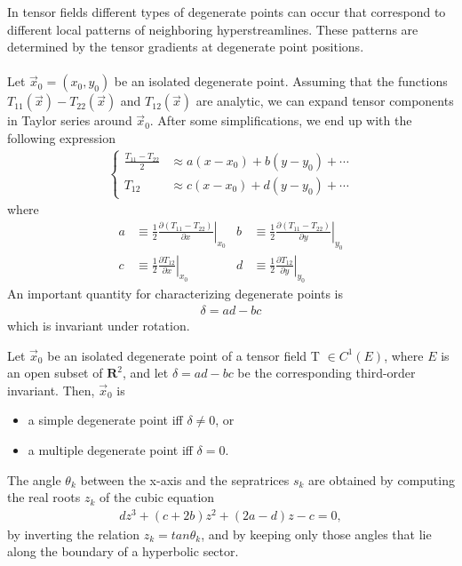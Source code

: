 \documentclass[main.tex]{subfiles}
\begin{document}
In tensor fields different types of degenerate points can occur that correspond to different
local patterns of neighboring hyperstreamlines. These patterns are determined by the tensor
gradients at degenerate point positions.
\\
\\
Let $\vec{x}_0 = (x_0,y_0)$ be an isolated degenerate point. Assuming that the functions 
$T_{11}(\vec{x}) - T_{22}(\vec{x})$ and $T_{12}(\vec{x})$ are analytic, we can expand tensor
components in Taylor series around $\vec{x}_0$. After some simplifications, we end up with the following
expression
\begin{align*}
\left\{\begin{matrix}
 \frac{T_{11} - T_{22}}{2} &\approx a(x - x_0) + b(y - y_0) + \cdots \\
 T_{12} &\approx c(x - x_0) + d(y - y_0) + \cdots
\end{matrix}\right.
\end{align*}
where 
\begin{align*}
a &\equiv \frac{1}{2} \left.\frac{\partial (T_{11} - T_{22})}{\partial x}\right|_{x_0} &
b &\equiv \frac{1}{2} \left.\frac{\partial (T_{11} - T_{22})}{\partial y}\right|_{y_0} \\
c &\equiv \frac{1}{2} \left.\frac{\partial T_{12}}{\partial x}\right|_{x_0} &
d &\equiv \frac{1}{2} \left.\frac{\partial T_{12}}{\partial y}\right|_{y_0}
\end{align*}
An important quantity for characterizing degenerate points is
\begin{align*}
\delta = ad - bc
\end{align*}
which is invariant under rotation.
\begin{mydef} \label{definition}
Let $\vec{x}_0$ be an isolated degenerate point of a tensor field T $\in C^1(E)$, where $E$ is
an open subset of $\mathbf{R}^2$, and let $\delta = ad - bc$ be the corresponding third-order
invariant. Then, $\vec{x}_0$ is
\begin{itemize}
\item a simple degenerate point iff $\delta \neq 0$, or
\item a multiple degenerate point iff $\delta = 0$.
\end{itemize}
\end{mydef}

\begin{mytheo}
The angle $\theta_k$ between the x-axis and the sepratrices $s_k$ are obtained by computing
the real roots $z_k$ of the cubic equation
\begin{align} \label{cubic}
dz^3 + (c + 2b)z^2 + (2a - d)z - c = 0,
\end{align}
by inverting the relation $z_k = tan \theta_k$, and by keeping only those angles that lie along 
the boundary of a hyperbolic sector.
\end{mytheo}
\end{document}
